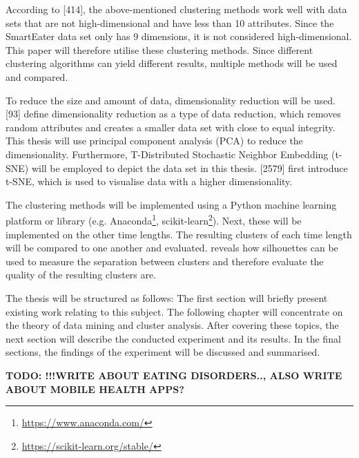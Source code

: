 According to \textcite{han2011data}[414], the above-mentioned clustering methods work well with data sets that are not high-dimensional and have less than 10 attributes. Since the SmartEater data set only has 9 dimensions, it is not considered high-dimensional. This paper will therefore utilise these clustering methods. Since different clustering algorithms can yield different results, multiple methods will be used and compared.

To reduce the size and amount of data, dimensionality reduction will be used. \textcite{han2011data}[93] define dimensionality reduction as a type of data reduction, which removes random attributes and creates a smaller data set with close to equal integrity. This thesis will use principal component analysis (PCA) to reduce the dimensionality.
Furthermore, T-Distributed Stochastic Neighbor Embedding (t-SNE) will be employed to depict the data set in this thesis. \textcite{maaten2008visualizing}[2579] first introduce t-SNE, which is used to visualise data with a higher dimensionality. 

The clustering methods will be implemented using a Python machine learning platform or library (e.g. Anaconda\footnote{\url{https://www.anaconda.com/}}, scikit-learn\footnote{\url{https://scikit-learn.org/stable/}}). Next, these will be implemented on the other time lengths. The resulting clusters of each time length will be compared to one another and evaluated. 
\textcite{rousseeuw1987silhouettes} reveals how silhouettes can be used to measure the separation between clusters and therefore evaluate the quality of the resulting clusters are.



The thesis will be structured as follows: The first section will briefly present existing work relating to this subject. The following chapter will concentrate on the theory of data mining and cluster analysis. After covering these topics, the next section will describe the conducted experiment and its results. In the final sections, the findings of the experiment will be discussed and summarised. 


\textbf{TODO: !!!WRITE ABOUT EATING DISORDERS.., ALSO WRITE ABOUT MOBILE HEALTH APPS?}
